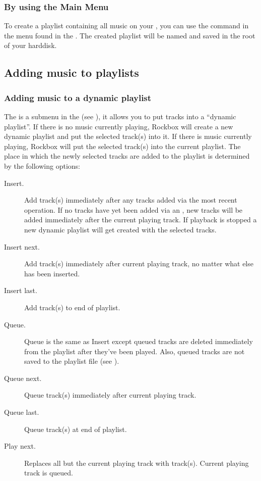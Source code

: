 \subsubsection{By using the Main Menu}
To create a playlist containing all music on your \dap{}, you can use the
 command in the  menu found
in the . The created playlist will be named
 and saved in the root of your \daps{} harddisk.

\subsection{Adding music to playlists}
  
\subsubsection{\label{ref:playlist_submenu}Adding music to a dynamic playlist}
The  is a submenu in the  (see
), it allows you to put tracks into a
``dynamic playlist''. If there is no music currently playing, Rockbox will
create a new dynamic playlist and put the selected track(s) into it.
If there is music currently playing, Rockbox will put the
selected track(s) into the current playlist. The place in which the newly
selected tracks are added to the playlist is determined by the following
options:

\begin{description} 
\item [Insert.] Add track(s) immediately after any tracks added via the most
  recent  operation. If no tracks have yet been added via an
  , new tracks will be added immediately after the current
  playing track. If playback is stopped a new dynamic playlist will get
  created with the selected tracks.
  
\item [Insert next.] Add track(s) immediately after current playing
  track, no matter what else has been inserted.
  
\item [Insert last.] Add track(s) to end of playlist.
  
\item [Queue.] Queue is the same as Insert except queued tracks are
  deleted immediately from the playlist after they've been played. Also,
  queued tracks are not saved to the playlist file (see
  ).
  
\item [Queue next.] Queue track(s) immediately after current playing track.
  
\item [Queue last.] Queue track(s) at end of playlist.

\item [Play next.] Replaces all but the current playing track with track(s).
    Current playing track is queued.
\end{description}

